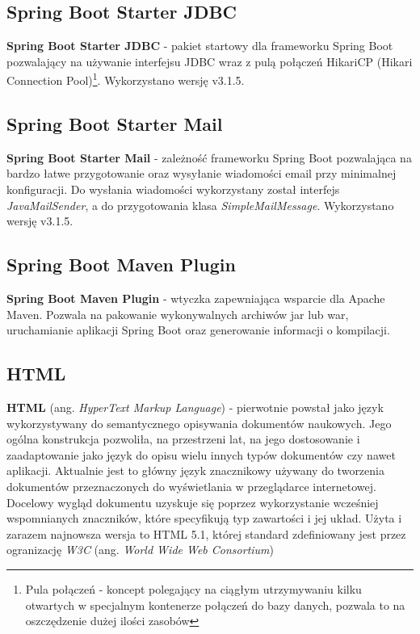 \documentclass[11pt,a4paper]{article}
\begin{document}
\subsection{Spring Boot Starter JDBC}
\textbf{Spring Boot Starter JDBC} \cite{spring-boot-jdbc} - pakiet startowy dla frameworku Spring Boot pozwalający na używanie interfejsu JDBC wraz z pulą połączeń HikariCP (Hikari Connection Pool)\footnote{Pula połączeń - koncept polegający na ciągłym utrzymywaniu kilku otwartych w specjalnym kontenerze połączeń do bazy danych, pozwala to na oszczędzenie dużej ilości zasobów}. Wykorzystano wersję v3.1.5.

\subsection{Spring Boot Starter Mail}
\textbf{Spring Boot Starter Mail} \cite{spring-boot-mail} - zależność frameworku Spring Boot pozwalająca na bardzo łatwe przygotowanie oraz wysyłanie wiadomości email przy minimalnej konfiguracji. Do wysłania wiadomości wykorzystany został interfejs \textsl{JavaMailSender}, a do przygotowania klasa \textsl{SimpleMailMessage}. Wykorzystano wersję v3.1.5.

\subsection{Spring Boot Maven Plugin}
\textbf{Spring Boot Maven Plugin} \cite{spring-boot-maven} - wtyczka zapewniająca wsparcie dla Apache Maven. Pozwala na pakowanie wykonywalnych archiwów jar lub war, uruchamianie aplikacji Spring Boot oraz generowanie informacji o kompilacji.

\subsection{HTML}
\textbf{HTML} (ang. \textsl{HyperText Markup Language}) \cite{html} - pierwotnie powstał jako język wykorzystywany do semantycznego opisywania dokumentów naukowych. Jego ogólna konstrukcja pozwoliła, na przestrzeni lat, na jego dostosowanie i zaadaptowanie jako język do opisu wielu innych typów dokumentów czy nawet aplikacji. Aktualnie jest to główny język znacznikowy używany do tworzenia dokumentów przeznaczonych do wyświetlania w przeglądarce internetowej. Docelowy wygląd dokumentu uzyskuje się poprzez wykorzystanie wcześniej wspomnianych znaczników, które specyfikują typ zawartości i jej układ. Użyta i zarazem najnowsza wersja to HTML 5.1, której standard zdefiniowany jest przez ogranizację \textsl{W3C} (ang. \textsl{World Wide Web Consortium})
\end{document}
